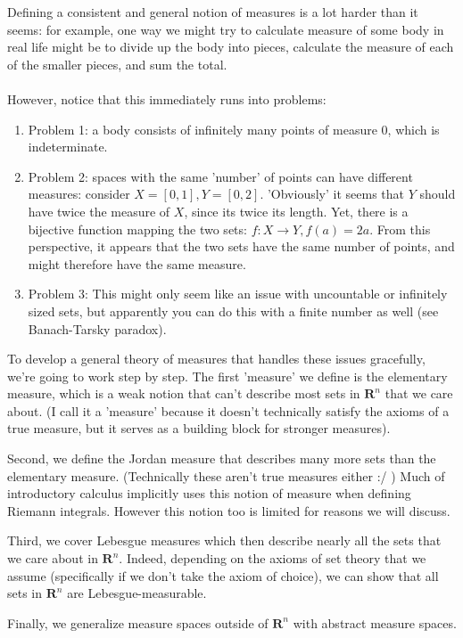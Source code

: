 \documentclass[answers,12pt]{exam}
\begin{document}
Defining a consistent and general notion of measures is a lot harder than it seems: for example, one way we might try to calculate measure of some body in real life might be to divide up the body into pieces, calculate the measure of each of the smaller pieces, and sum the total.\\ \\
However, notice that this immediately runs into problems: 
\begin{enumerate}
    \item Problem 1: a body consists of infinitely many points of measure 0, which is indeterminate. 
    \item Problem 2: spaces with the same 'number' of points can have different measures: consider
    $X=[0,1], Y=[0,2]$.
    'Obviously' it seems that $Y$ should have twice the measure of $X$, since its twice its length.
    Yet, there is a bijective function mapping the two sets: $f: X \rightarrow Y, f(a)=2a$.
    From this perspective, it appears that the two sets have the same number of points, and might therefore have the same measure.
    \item Problem 3: This might only seem like an issue with uncountable or infinitely sized sets, but apparently you can do this with a finite number as well (see Banach-Tarsky paradox).
\end{enumerate}

To develop a general theory of measures that handles these issues gracefully, we're going to work step by step.
The first 'measure' we define is the elementary measure, which is a weak notion that can't describe most sets in $\mathbf{R}^n$ that we care about.
(I call it a 'measure' because it doesn't technically satisfy the axioms of a true measure, but it serves as a building block for stronger measures).

Second, we define the Jordan measure that describes many more sets than the elementary measure.
(Technically these aren't true measures either :/ )
Much of introductory calculus implicitly uses this notion of measure when defining Riemann integrals.
However this notion too is limited for reasons we will discuss.

Third, we cover Lebesgue measures which then describe nearly all the sets that we care about in $\mathbf{R}^n$.
Indeed, depending on the axioms of set theory that we assume (specifically if we don't take the axiom of choice), we can show that all sets in $\mathbf{R}^n$ are Lebesgue-measurable.

Finally, we generalize measure spaces outside of $\mathbf{R}^n$ with abstract measure spaces.
\end{document}

